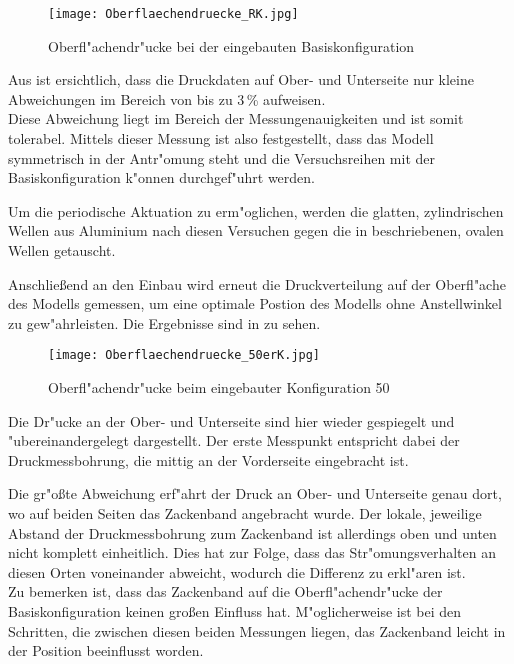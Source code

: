 \begin{figure}[h]
	\centering
	\texttt{[image: Oberflaechendruecke\_RK.jpg]}
	\caption{Oberfl"achendr"ucke bei der eingebauten Basiskonfiguration}
	\label{fig:Oberflaechendruckverteilung RK}
\end{figure}

Aus  ist ersichtlich, dass die Druckdaten auf Ober- und Unterseite nur kleine Abweichungen im Bereich von bis zu 3\,\% aufweisen.\\
Diese Abweichung liegt im Bereich der Messungenauigkeiten und ist somit tolerabel.
Mittels dieser Messung ist also festgestellt, dass das Modell symmetrisch in der Antr"omung steht und die Versuchsreihen mit der Basiskonfiguration k"onnen durchgef"uhrt werden.

Um die periodische Aktuation zu erm"oglichen, werden die glatten, zylindrischen Wellen aus Aluminium nach diesen Versuchen gegen die in  beschriebenen, ovalen Wellen getauscht.

Anschlie\ss{}end an den Einbau wird erneut die Druckverteilung auf der Oberfl"ache des Modells gemessen, um eine optimale Postion des Modells ohne Anstellwinkel zu gew"ahrleisten. Die Ergebnisse sind in 
zu sehen.

	\begin{figure}[h]
	\centering
	\texttt{[image: Oberflaechendruecke\_50erK.jpg]}
	\caption{Oberfl"achendr"ucke beim eingebauter Konfiguration 50}
	\label{fig:Oberflaechendruckverteilung 50}
	\end{figure}

Die Dr"ucke an der Ober- und Unterseite sind hier wieder gespiegelt und "ubereinandergelegt dargestellt. Der erste Messpunkt entspricht dabei der Druckmessbohrung, die mittig an der Vorderseite eingebracht ist.

Die gr"o\ss{}te Abweichung erf"ahrt der Druck an Ober- und Unterseite genau dort, wo auf beiden Seiten das Zackenband angebracht wurde. Der lokale, jeweilige Abstand der Druckmessbohrung zum Zackenband ist allerdings oben und unten nicht komplett einheitlich. Dies hat zur Folge, dass das Str"omungsverhalten an diesen Orten voneinander abweicht, wodurch die Differenz zu erkl"aren ist.\\
Zu bemerken ist, dass das Zackenband auf die Oberfl"achendr"ucke der Basiskonfiguration keinen gro\ss{}en Einfluss hat. M"oglicherweise ist bei den Schritten, die zwischen diesen beiden Messungen liegen, das Zackenband leicht in der Position beeinflusst worden.

